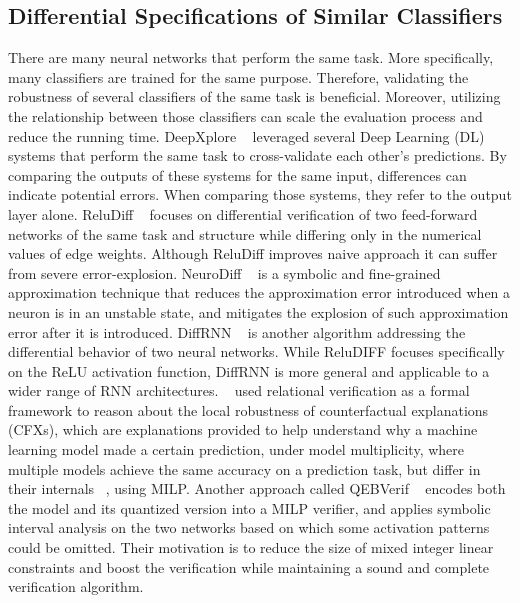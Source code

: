 \subsection{Differential Specifications of Similar Classifiers}
There are many neural networks that perform the same task. More specifically, many classifiers are trained for the same purpose. Therefore, validating the robustness of several classifiers of the same task is beneficial. Moreover, utilizing the relationship between those classifiers can scale the evaluation process and reduce the running time. DeepXplore ~\cite{DEEPXPLORE} leveraged several Deep Learning (DL) systems that perform the same task to cross-validate each other’s predictions. By comparing the outputs of these systems for the same input, differences can indicate potential errors. When comparing those systems, they refer to the output layer alone. ReluDiff ~\cite{RELUDIFF} focuses on differential verification of two feed-forward networks of the same task and structure while differing only in the numerical values of edge weights. Although ReluDiff improves naive approach it can suffer from severe error-explosion.   NeuroDiff ~\cite{NEURODIFF} is a symbolic and fine-grained approximation technique that reduces the approximation error introduced when a neuron is in an unstable state, and mitigates the explosion of such approximation error after
it is introduced. DiffRNN ~\cite{DIFFRNN} is another algorithm addressing the differential behavior of two neural networks. While ReluDIFF focuses specifically on the ReLU activation function, DiffRNN is more general and applicable to a wider range of RNN architectures. ~\cite{CFXROBUSTNESS} used relational verification as a formal framework to reason about the local robustness of counterfactual explanations (CFXs), which are explanations provided to help understand why a machine learning model made a certain prediction, under model multiplicity, where multiple models achieve the same accuracy on a prediction task, but differ in their internals ~\cite{PREDICTIVEMULTIPICITY}, using MILP. Another approach called QEBVerif ~\cite{QEBVERIF} encodes both the model and its quantized version into a MILP verifier, and applies symbolic interval analysis on the two networks based on which some activation patterns could be omitted. Their motivation is to reduce the size of mixed integer linear constraints and boost the verification while maintaining a sound and complete verification algorithm. 